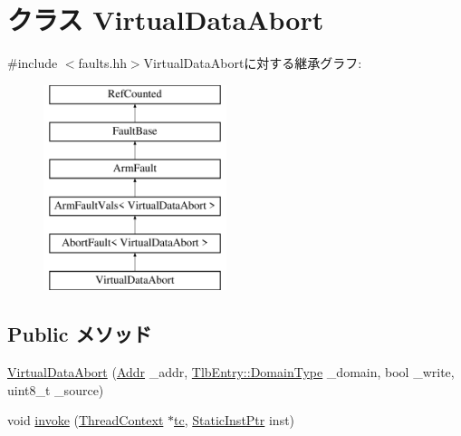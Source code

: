 \hypertarget{classArmISA_1_1VirtualDataAbort}{
\section{クラス VirtualDataAbort}
\label{classArmISA_1_1VirtualDataAbort}
}


{\ttfamily \#include $<$faults.hh$>$}VirtualDataAbortに対する継承グラフ:\begin{figure}[H]
\begin{center}
\leavevmode
\includegraphics[height=6cm]{classArmISA_1_1VirtualDataAbort}
\end{center}
\end{figure}
\subsection*{Public メソッド}
\begin{DoxyCompactItemize}
\item 
\hyperlink{classArmISA_1_1VirtualDataAbort_a144ebf1c82b0b283c23af51e73cf00bd}{VirtualDataAbort} (\hyperlink{classm5_1_1params_1_1Addr}{Addr} \_\-addr, \hyperlink{structArmISA_1_1TlbEntry_a0595b41cfb7d03f18438f9c355a3469d}{TlbEntry::DomainType} \_\-domain, bool \_\-write, uint8\_\-t \_\-source)
\item 
void \hyperlink{classArmISA_1_1VirtualDataAbort_a38260dc6f5fb9598eaf95d8696e3efe8}{invoke} (\hyperlink{classThreadContext}{ThreadContext} $\ast$\hyperlink{namespaceArmISA_a5aff829af55e65b802d83dfcef4e9dd0}{tc}, \hyperlink{classRefCountingPtr}{StaticInstPtr} inst)
\end{DoxyCompactItemize}
